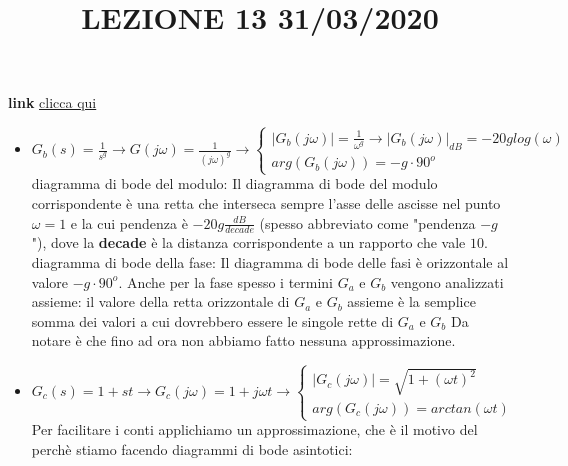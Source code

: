 \title{LEZIONE 13 31/03/2020}\newline
\textbf{link} \href{https://web.microsoftstream.com/video/22a546ac-3e6b-43e0-b0f9-45a630661700?list=user&userId=faa91214-a6f5-40d7-8875-253fd49b8ce1}{clicca qui}
\begin{itemize}
    \item $G_b(s)= \frac{1}{s^g} \rightarrow G(j \omega) = \frac{1}{(j \omega)^g} \rightarrow \begin{cases}
        |G_b(j \omega)| = \frac{1}{\omega^g} \rightarrow |G_b(j \omega)|_{dB}= - 20 g log(\omega)\\
        arg(G_b(j \omega)) = - g \cdot 90^o
    \end{cases} $\newline \newline
    diagramma di bode del modulo: Il diagramma di bode del modulo corrispondente è una retta che interseca sempre l'asse delle ascisse nel punto $\omega = 1$ e la cui pendenza è $-20g \frac{dB}{decade}$ (spesso abbreviato come "pendenza $-g$"), dove la \textbf{decade} è la distanza corrispondente a un rapporto che vale $10$.\newline \newline
    diagramma di bode della fase: Il diagramma di bode delle fasi è orizzontale al valore $-g \cdot 90^o$. Anche per la fase spesso i termini $G_a$ e $G_b$ vengono analizzati assieme: il valore della retta orizzontale di $G_a$ e $G_b$ assieme è la semplice somma dei valori a cui dovrebbero essere le singole rette di $G_a$ e $G_b$\newline \newline
    Da notare è che fino ad ora non abbiamo fatto nessuna approssimazione.
    \item $G_c(s)= 1 + st \rightarrow  G_c(j \omega) = 1 + j \omega t \rightarrow \begin{cases}
        |G_c(j \omega)| = \sqrt{1 + (\omega t)^2}\\
        arg(G_c(j \omega))= arctan(\omega t)
    \end{cases}$\newline
    Per facilitare i conti applichiamo un approssimazione, che è il motivo del perchè stiamo facendo diagrammi di bode asintotici:
\end{itemize}
